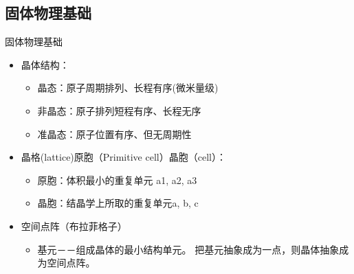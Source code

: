 \documentclass[trans]{beamer} %
\begin{document}
\subsection{固体物理基础}
\begin{frame}{固体物理基础}
    \begin{itemize}
        \item \alert{晶体结构：}\\
            \begin{itemize}
            \item<2-| alert@2>[+] 晶态：原子周期排列、长程有序(微米量级) 
            \item<2-| alert@3>[+] 非晶态：原子排列短程有序、长程无序
            \item<2-| alert@4>[+] 准晶态：原子位置有序、但无周期性
        
                \end{itemize}
        \item \alert{晶格(lattice)原胞（Primitive cell）晶胞（cell）}：\\
                \begin{itemize}
            \item<2-| alert@5>[+] 原胞：体积最小的重复单元 a1, a2, a3

            \item<2-| alert@6>[+] 晶胞：结晶学上所取的重复单元a, b, c

                \end{itemize}
        \item \alert{空间点阵（布拉菲格子）}
    
        \begin{itemize}
            \item<2-| alert@7>[+] 基元－－组成晶体的最小结构单元。
    把基元抽象成为一点，则晶体抽象成为空间点阵。\\
           \end{itemize}     

    \end{itemize}

\end{frame}
\end{document}
